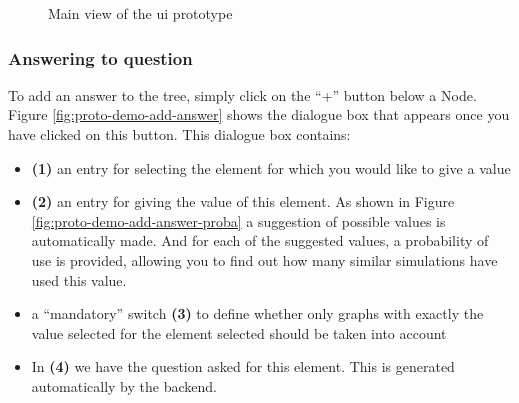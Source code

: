     \begin{figure}[h]
    \centering
    \caption{\label{fig:proto-demo}  Main view of the \acrshort{ui} prototype}
    \end{figure}
    
    
    \subsubsection{Answering to question}
    To add an answer to the tree, simply click on the “+” button below a Node. Figure \ref{fig:proto-demo-add-answer} shows the dialogue box that appears once you have clicked on this button. This dialogue box contains:
    
    \begin{itemize}
        \item \textbf{(1)} an entry for selecting the element for which you would like to give a value
        \item \textbf{(2)} an entry for giving the value of this element. As shown in Figure \ref{fig:proto-demo-add-answer-proba} a suggestion of possible values is automatically made. And for each of the suggested values, a probability of use is provided, allowing you to find out how many similar simulations have used this value.
        \item a “mandatory” switch \textbf{(3)} to define whether only graphs with exactly the value selected for the element selected should be taken into account
        \item In \textbf{(4)} we have the question asked for this element. This is generated automatically by the backend.
    \end{itemize}
    

